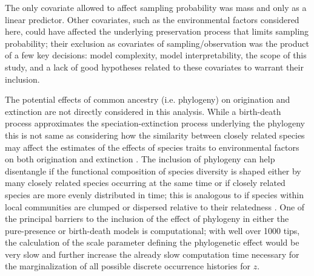 \documentclass[12pt,letterpaper]{article}
\begin{document}
The only covariate allowed to affect sampling probability was mass and only as a linear predictor. Other covariates, such as the environmental factors considered here, could have affected the underlying preservation process that limits sampling probability; their exclusion as covariates of sampling/observation was the product of a few key decisions: model complexity, model interpretability, the scope of this study, and a lack of good hypotheses related to these covariates to warrant their inclusion. %


The potential effects of common ancestry (i.e. phylogeny) on origination and extinction are not directly considered in this analysis. While a birth-death process approximates the speciation-extinction process underlying the phylogeny \citep{Silvestro2014a} this is not same as considering how the similarity between closely related species may affect the estimates of the effects of species traits to environmental factors on both origination and extinction \citep{Smits2015b,Harnik2014}. The inclusion of phylogeny can help disentangle if the functional composition of species diversity is shaped either by many closely related species occurring at the same time or if closely related species are more evenly distributed in time; this is analogous to if species within local communities are clumped or dispersed relative to their relatedness \citep{Webb2002,Kraft2007a,Cavender-Bares2009}. One of the principal barriers to the inclusion of the effect of phylogeny in either the pure-presence or birth-death models is computational; with well over 1000 tips, the calculation of the scale parameter defining the phylogenetic effect would be very slow and further increase the already slow computation time necessary for the marginalization of all possible discrete occurrence histories for \(z\).
\end{document}
